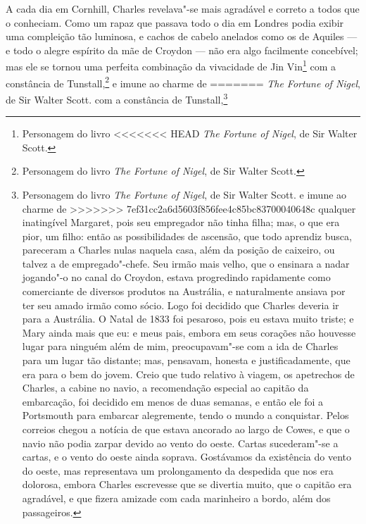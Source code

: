 {{{{{{{{{{{{{{{{{{{{{{{{{{{{A cada dia em Cornhill, Charles revelava"-se mais agradável e correto a
todos que o conheciam. Como um rapaz que passava todo o dia em Londres
podia exibir uma compleição tão luminosa, e cachos de cabelo anelados
como os de Aquiles --- e todo o alegre espírito da mãe de Croydon --- não
era algo facilmente concebível; mas ele se tornou uma perfeita
combinação da vivacidade de Jin Vin\footnote{Personagem do livro
<<<<<<< HEAD
  \textit{The Fortune of Nigel}, de Sir Walter Scott.} com
a constância de Tunstall,\footnote{Personagem do livro \textit{The Fortune
  of Nigel}, de Sir Walter Scott.} e imune ao charme de
=======
  \textit{The Fortune of Nigel}, de Sir Walter Scott.  com
a constância de Tunstall,\footnote{Personagem do livro \textit{The Fortune
  of Nigel}, de Sir Walter Scott.  e imune ao charme de
>>>>>>> 7ef31cc2a6d5603f856fee4c85bc83700040648c
qualquer inatingível Margaret, pois seu empregador não tinha filha; mas,
o que era pior, um filho: então as possibilidades de ascensão, que todo
aprendiz busca, pareceram a Charles nulas naquela casa, além da posição
de caixeiro, ou talvez a de empregado"-chefe. Seu irmão mais velho, que o
ensinara a nadar jogando"-o no canal do Croydon, estava progredindo
rapidamente como comerciante de diversos produtos na Austrália, e
naturalmente ansiava por ter seu amado irmão como sócio. Logo foi
decidido que Charles deveria ir para a Austrália. O Natal de 1833 foi
pesaroso, pois eu estava muito triste; e Mary ainda mais que eu: e meus
pais, embora em seus corações não houvesse lugar para ninguém além de
mim, preocupavam"-se com a ida de Charles para um lugar tão distante;
mas, pensavam, honesta e justificadamente, que era para o bem do jovem.
Creio que tudo relativo à viagem, os apetrechos de Charles, a cabine no
navio, a recomendação especial ao capitão da embarcação, foi decidido em
menos de duas semanas, e então ele foi a Portsmouth para embarcar
alegremente, tendo o mundo a conquistar. Pelos correios chegou a notícia
de que estava ancorado ao largo de Cowes, e que o navio não podia zarpar
devido ao vento do oeste. Cartas sucederam"-se a cartas, e o vento do
oeste ainda soprava. Gostávamos da existência do vento do oeste, mas
representava um prolongamento da despedida que nos era dolorosa, embora
Charles escrevesse que se divertia muito, que o capitão era agradável, e
que fizera amizade com cada marinheiro a bordo, além dos passageiros.

}}}}}}}}}}}}}}}}}}}}}}}}}}}}}
